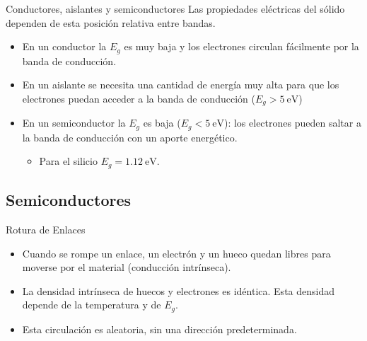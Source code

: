 \documentclass[xcolor={usenames,svgnames,dvipsnames}]{beamer}
\begin{document}
\begin{frame}[label=sec-1-1-6]{Conductores, aislantes y semiconductores}
Las \alert{propiedades eléctricas} del sólido dependen de esta \alert{posición relativa entre bandas}.

\begin{itemize}
\item En un \alert{conductor} la $E_{g}$ es muy baja y los electrones circulan fácilmente por la banda de conducción.

\item En un \alert{aislante} se necesita una cantidad de energía muy alta para que los electrones puedan acceder a la banda de conducción   ($E_{g}>\SI{5}{\electronvolt}$)

\item En un \alert{semiconductor} la $E_{g}$ es baja ($E_{g}<\SI{5}{\electronvolt}$): los electrones pueden \guillemotleft{}saltar\guillemotright{} a la banda de conducción con un aporte energético.

\begin{itemize}
\item Para el silicio $E_{g}=\SI{1.12}{\electronvolt}$.
\end{itemize}
\end{itemize}
\end{frame}

\subsection{Semiconductores}
\label{sec-1-2}

\begin{frame}[label=sec-1-2-1]{Rotura de Enlaces}
\begin{itemize}
\item Cuando se rompe un enlace, un electrón y un hueco quedan libres para moverse por el material (conducción intrínseca).

\item La \alert{densidad intrínseca de huecos y electrones es idéntica}. Esta densidad depende de la temperatura y de $E_{g}$.

\item Esta \alert{circulación es aleatoria}, sin una dirección predeterminada.
\end{itemize}
\end{frame}
\end{document}
